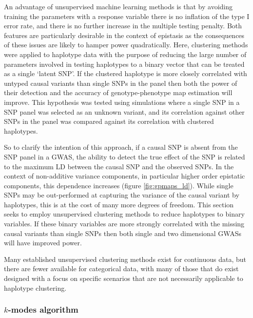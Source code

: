An advantage of unsupervised machine learning methods is that by avoiding training the parameters with a response variable there is no inflation of the type I error rate, and there is no further increase in the multiple testing penalty. Both features are particularly desirable in the context of epistasis as the consequences of these issues are likely to hamper power quadratically. Here, clustering methods were applied to haplotype data with the purpose of reducing the large number of parameters involved in testing haplotypes to a binary vector that can be treated as a single `latent SNP'. If the clustered haplotype is more closely correlated with untyped causal variants than single SNPs in the panel then both the power of their detection and the accuracy of genotype-phenotype map estimation will improve. This hypothesis was tested using simulations where a single SNP in a SNP panel was selected as an unknown variant, and its correlation against other SNPs in the panel was compared against its correlation with clustered haplotypes.

So to clarify the intention of this approach, if a causal SNP is absent from the SNP panel in a GWAS, the ability to detect the true effect of the SNP is related to the maximum LD between the causal SNP and the observed SNPs. In the context of non-additive variance components, in particular higher order epistatic components, this dependence increases (figure \ref{fig:gpmaps_ld}). While single SNPs may be out-performed at capturing the variance of the causal variant by haplotypes, this is at the cost of many more degrees of freedom. This section seeks to employ unsupervised clustering methods to reduce haplotypes to binary variables. If these binary variables are more strongly correlated with the missing causal variants than single SNPs then both single and two dimensional GWASs will have improved power.

Many established unsupervised clustering methods exist for continuous data, but there are fewer available for categorical data, with many of those that do exist designed with a focus on specific scenarios that are not necessarily applicable to haplotype clustering.

\subsubsection{$k$-modes algorithm}

